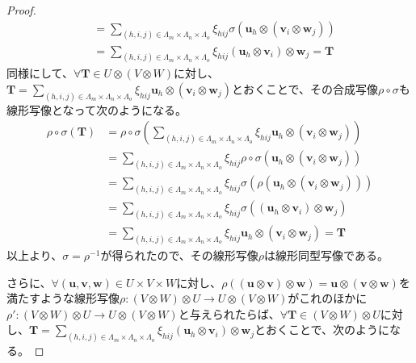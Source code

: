 \documentclass[dvipdfmx]{jsarticle}
\begin{document}
\begin{proof}
\begin{align*}
&= \sum_{(h,i,j) \in \varLambda_{m} \times \varLambda_{n} \times \varLambda_{o}} {\xi_{hij}\sigma\left( \mathbf{u}_{h} \otimes \left( \mathbf{v}_{i} \otimes \mathbf{w}_{j} \right) \right)}\\
&= \sum_{(h,i,j) \in \varLambda_{m} \times \varLambda_{n} \times \varLambda_{o}} {\xi_{hij}\left( \mathbf{u}_{h} \otimes \mathbf{v}_{i} \right) \otimes \mathbf{w}_{j}} = \mathbf{T}
\end{align*}
同様にして、$\forall\mathbf{T} \in U \otimes (V \otimes W)$に対し、$\mathbf{T} = \sum_{(h,i,j) \in \varLambda_{m} \times \varLambda_{n} \times \varLambda_{o}} {\xi_{hij}\mathbf{u}_{h} \otimes \left( \mathbf{v}_{i} \otimes \mathbf{w}_{j} \right)}$とおくことで、その合成写像$\rho \circ \sigma$も線形写像となって次のようになる。
\begin{align*}
\rho \circ \sigma\left( \mathbf{T} \right) &= \rho \circ \sigma\left( \sum_{(h,i,j) \in \varLambda_{m} \times \varLambda_{n} \times \varLambda_{o}} {\xi_{hij}\mathbf{u}_{h} \otimes \left( \mathbf{v}_{i} \otimes \mathbf{w}_{j} \right)} \right)\\
&= \sum_{(h,i,j) \in \varLambda_{m} \times \varLambda_{n} \times \varLambda_{o}} {\xi_{hij}\rho \circ \sigma\left( \mathbf{u}_{h} \otimes \left( \mathbf{v}_{i} \otimes \mathbf{w}_{j} \right) \right)}\\
&= \sum_{(h,i,j) \in \varLambda_{m} \times \varLambda_{n} \times \varLambda_{o}} {\xi_{hij}\sigma\left( \rho\left( \mathbf{u}_{h} \otimes \left( \mathbf{v}_{i} \otimes \mathbf{w}_{j} \right) \right) \right)}\\
&= \sum_{(h,i,j) \in \varLambda_{m} \times \varLambda_{n} \times \varLambda_{o}} {\xi_{hij}\sigma\left( \left( \mathbf{u}_{h} \otimes \mathbf{v}_{i} \right) \otimes \mathbf{w}_{j} \right)}\\
&= \sum_{(h,i,j) \in \varLambda_{m} \times \varLambda_{n} \times \varLambda_{o}} {\xi_{hij}\mathbf{u}_{h} \otimes \left( \mathbf{v}_{i} \otimes \mathbf{w}_{j} \right)} = \mathbf{T}
\end{align*}
以上より、$\sigma = \rho^{- 1}$が得られたので、その線形写像$\rho$は線形同型写像である。\par
さらに、$\forall\left( \mathbf{u},\mathbf{v},\mathbf{w} \right) \in U \times V \times W$に対し、$\rho\left( \left( \mathbf{u} \otimes \mathbf{v} \right) \otimes \mathbf{w} \right) = \mathbf{u} \otimes \left( \mathbf{v} \otimes \mathbf{w} \right)$を満たすような線形写像$\rho:(V \otimes W) \otimes U \rightarrow U \otimes (V \otimes W)$がこれのほかに$\rho':(V \otimes W) \otimes U \rightarrow U \otimes (V \otimes W)$と与えられたらば、$\forall\mathbf{T} \in (V \otimes W) \otimes U$に対し、$\mathbf{T} = \sum_{(h,i,j) \in \varLambda_{m} \times \varLambda_{n} \times \varLambda_{o}} {\xi_{hij}\left( \mathbf{u}_{h} \otimes \mathbf{v}_{i} \right) \otimes \mathbf{w}_{j}}$とおくことで、次のようになる。

\end{proof}
\end{document}
